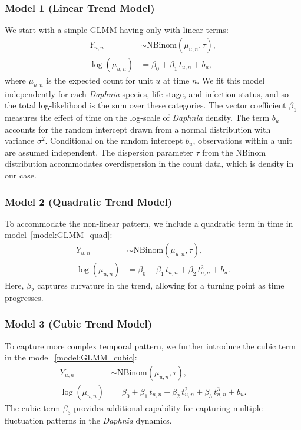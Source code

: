 \documentclass[aoas,preprint]{imsart}\usepackage[]{graphicx}\usepackage[]{xcolor}
\newcommand\unit{u}
\newcommand\benchmarktime{n}
\begin{document}
\subsubsection{Model 1 (Linear Trend Model)}
We start with a simple GLMM having only with linear terms:
\begin{align}
Y_{\unit,\benchmarktime} &\sim \text{NBinom}(\mu_{\unit,\benchmarktime}, \tau), \\[6pt]
\log(\mu_{\unit,\benchmarktime}) &= \beta_0 + \beta_1\, t_{\unit,\benchmarktime} + b_{\unit},
\label{model:GLMM_linear}
\end{align}
where $\mu_{\unit,\benchmarktime}$ is the expected count for unit $\unit$ at time $\benchmarktime$.
We fit this model independently for each {\it Daphnia} species, life stage, and infection status, and so the total log-likelihood is the sum over these categories.
The vector coefficient $\beta_1$ measures the effect of time on the log-scale of \textit{Daphnia} density.
The term $b_\unit$ accounts for the random intercept drawn from a normal distribution with variance $\sigma^2$.
Conditional on the random intercept $b_\unit$, observations within a unit are assumed independent.
The dispersion parameter $\tau$ from the NBinom distribution accommodates overdispersion in the count data, which is density in our case.


\subsubsection{Model 2 (Quadratic Trend Model)}
To accommodate the non-linear pattern, we include a quadratic term in time in model~\ref{model:GLMM_quad}:
\begin{align}
Y_{\unit,\benchmarktime} &\sim \text{NBinom}(\mu_{\unit,\benchmarktime}, \tau), \\[6pt]
\log(\mu_{\unit,\benchmarktime}) &= \beta_0 + \beta_1\, t_{\unit,\benchmarktime} + \beta_2\, t_{\unit,\benchmarktime}^2 + b_{\unit}.
\label{model:GLMM_quad}
\end{align}
Here, $\beta_2$ captures curvature in the trend, allowing for a turning point as time progresses.

\subsubsection{Model 3 (Cubic Trend Model)}
To capture more complex temporal pattern, we further introduce the cubic term in the model~\ref{model:GLMM_cubic}:
\begin{align}
Y_{\unit,\benchmarktime} &\sim \text{NBinom}(\mu_{\unit,\benchmarktime}, \tau), \\[6pt]
\log(\mu_{\unit,\benchmarktime}) &= \beta_0 + \beta_1\, t_{\unit,\benchmarktime} + \beta_2\, t_{\unit,\benchmarktime}^2 + \beta_3\, t_{\unit,\benchmarktime}^3 + b_{\unit}.
\label{model:GLMM_cubic}
\end{align}
The cubic term $\beta_3$ provides additional capability for capturing multiple fluctuation patterns in the \textit{Daphnia} dynamics.
\end{document}
